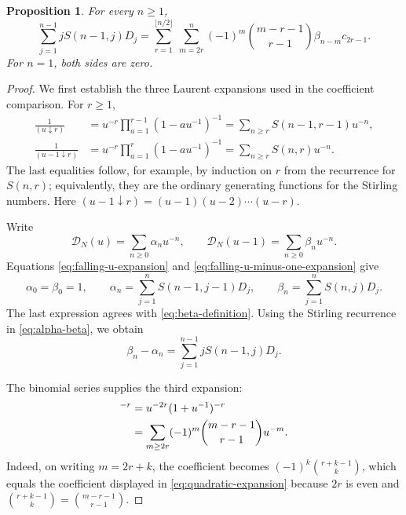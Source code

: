 \documentclass[11pt]{amsart}
\numberwithin{equation}{section}
\newtheorem{proposition}[theorem]{Proposition}
\theoremstyle{definition}
\theoremstyle{remark}
\newcommand{\fall}[2]{(#1\mathbin{\downarrow}#2)}
\newcommand{\calD}{\mathcal D}
\begin{document}
\begin{proposition}
\label{prop:coefficient-recursion}
For every \(n\geq1\),
\begin{equation}
 \boxed{
 \sum_{j=1}^{n-1}jS(n-1,j)D_j
 =\sum_{r=1}^{\lfloor n/2\rfloor}\ \sum_{m=2r}^{n}
 (-1)^m\binom{m-r-1}{r-1}
 \beta_{n-m}c_{2r-1}.}
 \label{eq:coefficient-recursion}
\end{equation}
For \(n=1\), both sides are zero.
\end{proposition}

\begin{proof}
We first establish the three Laurent expansions used in the
coefficient comparison.  For \(r\geq1\),
\begin{align}
 \frac{1}{\fall{u}{r}}
 &=u^{-r}\prod_{a=1}^{r-1}(1-au^{-1})^{-1}
 =\sum_{n\geq r}S(n-1,r-1)u^{-n},
 \label{eq:falling-u-expansion}\\
 \frac{1}{\fall{u-1}{r}}
 &=u^{-r}\prod_{a=1}^{r}(1-au^{-1})^{-1}
 =\sum_{n\geq r}S(n,r)u^{-n}.
 \label{eq:falling-u-minus-one-expansion}
\end{align}
The last equalities follow, for example, by induction on \(r\) from
the recurrence for \(S(n,r)\); equivalently, they are the ordinary
generating functions for the Stirling numbers.  Here
\(\fall{u-1}{r}=(u-1)(u-2)\cdots(u-r)\).

Write
\[
 \calD_N(u)=\sum_{n\geq0}\alpha_nu^{-n},
 \qquad
 \calD_N(u-1)=\sum_{n\geq0}\beta_nu^{-n}.
\]
Equations \eqref{eq:falling-u-expansion} and
\eqref{eq:falling-u-minus-one-expansion} give
\begin{equation}
 \alpha_0=\beta_0=1,
 \qquad
 \alpha_n=\sum_{j=1}^nS(n-1,j-1)D_j,
 \qquad
 \beta_n=\sum_{j=1}^nS(n,j)D_j.
 \label{eq:alpha-beta}
\end{equation}
The last expression agrees with \eqref{eq:beta-definition}.  Using
the Stirling recurrence in \eqref{eq:alpha-beta}, we obtain
\begin{equation}
 \beta_n-\alpha_n
 =\sum_{j=1}^{n-1}jS(n-1,j)D_j.
 \label{eq:beta-minus-alpha}
\end{equation}

The binomial series supplies the third expansion:
\begin{align}
 [u(u+1)]^{-r}
 &=u^{-2r}(1+u^{-1})^{-r}\notag\\
 &=\sum_{m\geq2r}(-1)^m
   \binom{m-r-1}{r-1}u^{-m}.
 \label{eq:quadratic-expansion}
\end{align}
Indeed, on writing \(m=2r+k\), the coefficient becomes
\((-1)^k\binom{r+k-1}{k}\), which equals the coefficient displayed
in \eqref{eq:quadratic-expansion} because \(2r\) is even and
\(\binom{r+k-1}{k}=\binom{m-r-1}{r-1}\).


\end{proof}
\end{document}
